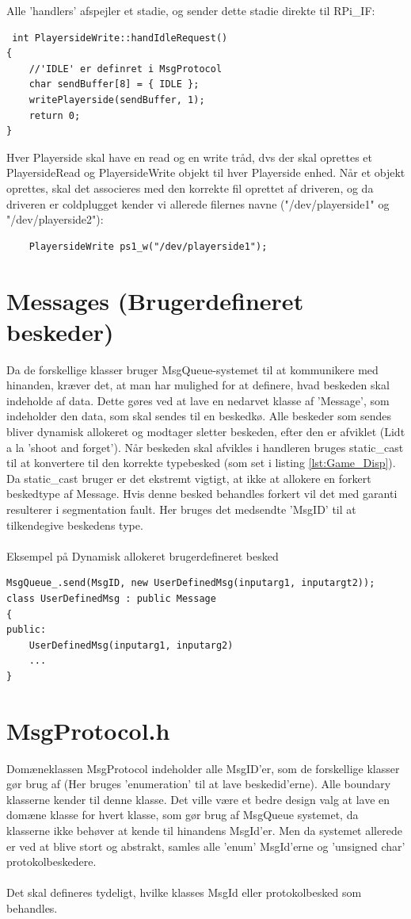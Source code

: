 \documentclass[Softwaredesign/Softwaredesign_main.tex]{subfiles}
\begin{document}
Alle 'handlers' afspejler et stadie, og sender dette stadie direkte til RPi\_IF: 
\begin{lstlisting}
 int PlayersideWrite::handIdleRequest()
{
    //'IDLE' er definret i MsgProtocol 
	char sendBuffer[8] = { IDLE };
	writePlayerside(sendBuffer, 1);
	return 0;
}
\end{lstlisting}
Hver Playerside skal have en read og en write tråd, dvs der skal oprettes et PlayersideRead og PlayersideWrite objekt til hver Playerside enhed. Når et objekt oprettes, skal det associeres med den korrekte fil oprettet af driveren, og da driveren er coldplugget kender vi allerede filernes navne ("/dev/playerside1" og "/dev/playerside2"): 
\begin{lstlisting}
    PlayersideWrite ps1_w("/dev/playerside1");
\end{lstlisting}
\section{Messages (Brugerdefineret beskeder)}
Da de forskellige klasser bruger MsgQueue-systemet til at kommunikere med hinanden, kræver det, at man har mulighed for at definere, hvad beskeden skal indeholde af data. Dette gøres ved at lave en nedarvet klasse af 'Message', som indeholder den data, som skal sendes til en beskedkø. Alle beskeder som sendes bliver dynamisk allokeret og modtager sletter beskeden, efter den er afviklet (Lidt a la 'shoot and forget'). Når beskeden skal afvikles i handleren bruges static\_cast til at konvertere til den korrekte typebesked (som set i listing \ref{lst:Game_Disp}). Da static\_cast bruger er det ekstremt vigtigt, at ikke at allokere en forkert beskedtype af Message. Hvis denne besked behandles forkert vil det med garanti resulterer i segmentation fault. Her bruges det medsendte 'MsgID' til at tilkendegive beskedens type. \\\\
Eksempel på Dynamisk allokeret brugerdefineret besked
\begin{lstlisting}
MsgQueue_.send(MsgID, new UserDefinedMsg(inputarg1, inputargt2));
class UserDefinedMsg : public Message
{
public:
    UserDefinedMsg(inputarg1, inputarg2)
    ...
}
\end{lstlisting}
\section{MsgProtocol.h}
Domæneklassen MsgProtocol indeholder alle MsgID'er, som de forskellige klasser gør brug af (Her bruges 'enumeration' til at lave beskedid'erne). Alle boundary klasserne kender til denne klasse. Det ville være et bedre design valg at lave en domæne klasse for hvert klasse, som gør brug af MsgQueue systemet, da klasserne ikke behøver at kende til hinandens MsgId'er. Men da systemet allerede er ved at blive stort og abstrakt, samles alle 'enum' MsgId'erne og 'unsigned char' protokolbeskedere. \\\\
Det skal defineres tydeligt, hvilke klasses MsgId eller protokolbesked som behandles.
\end{document}
